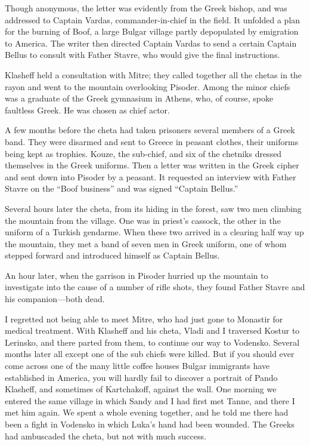 \documentclass[a5paper,12pt]{book}
\begin{document}
Though anonymous, the letter was evidently from the Greek bishop, and was addressed to Captain Vardas, commander-in-chief in the field. It unfolded a plan for the burning of Boof, a large Bulgar village partly depopulated by emigration to America. The writer then directed Captain Vardas to send a certain Captain Bellus to consult with Father Stavre, who would give the final instructions. 

Klasheff held a consultation with Mitre; they called together all the chetas in the rayon and went to the mountain overlooking Pisoder. Among the minor chiefs was a graduate of the Greek gymnasium in Athens, who, of course, spoke faultless Greek. He was chosen as chief actor. 

A few months before the cheta had taken prisoners several members of a Greek band. They were disarmed and sent to Greece in peasant clothes, their uniforms being kept as trophies. Kouze, the sub-chief, and six of the chetniks dressed themselves in the Greek uniforms. Then a letter was written in the Greek cipher and sent down into Pisoder by a peasant. It requested an interview with Father Stavre on the “Boof business” and was signed “Captain Bellus.”

Several hours later the cheta, from its hiding in the forest, saw two men climbing the mountain from the village. One was in priest’s cassock, the other in the uniform of a Turkish gendarme. When these two arrived in a clearing half way up the mountain, they met a band of seven men in Greek uniform, one of whom stepped forward and introduced himself as Captain Bellus. 

An hour later, when the garrison in Pisoder hurried up the mountain to investigate into the cause of a number of rifle shots, they found Father Stavre and his companion—both dead. 

I regretted not being able to meet Mitre, who had just gone to Monastir for medical treatment. With Klasheff and his cheta, Vladi and I traversed Kostur to Lerinsko, and there parted from them, to continue our way to Vodensko. Several months later all except one of the sub chiefs were killed. But if you should ever come across one of the many little coffee houses Bulgar immigrants have established in America, you will hardly fail to discover a portrait of Pando Klasheff, and sometimes of Kartchakoff, against the wall. One morning we entered the same village in which Sandy and I had first met Tanne, and there I met him again. We spent a whole evening together, and he told me there had been a fight in Vodensko in which Luka’s hand had been wounded. The Greeks had ambuscaded the cheta, but not with much success. 
\end{document}
